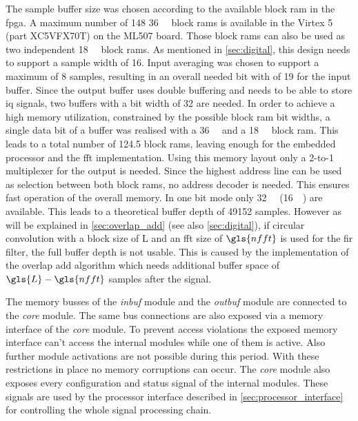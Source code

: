\documentclass[12pt,a4paper,parskip=full,abstract=true,BCOR=12mm,twoside,open=right]{scrreprt}
\def\device#1{\textit{#1}}
\begin{document}
The sample buffer size was chosen according to the available block
\gls{ram} in the \gls{fpga}. A maximum number of 148 \SI{36}{\kilo\bit} block
\glspl{ram} is available in the Virtex 5 (part XC5VFX70T) on the ML507 board\cite{virtex5ds}. Those block \glspl{ram}
can also be used as two independent \SI{18}{\kilo\bit} block \glspl{ram}. As
mentioned in \cref{sec:digital}, this design needs to support a sample width
of \SI{16}{\bit}. Input averaging was chosen to support a maximum of 8 samples,
resulting in an overall needed bit with of \SI{19}{\bit} for the input buffer. Since
the output buffer uses double buffering and needs to be able to store \gls{iq} signals,
two buffers with a bit width of \SI{32}{\bit} are needed. In order to achieve a high memory utilization,
constrained by the possible block \gls{ram} bit widths, a single data bit of a buffer was
realised with a \SI{36}{\kilo\bit} and a \SI{18}{\kilo\bit} block \gls{ram}. This leads
to a total number of 124.5 block \glspl{ram}, leaving enough for the embedded processor
and the \gls{fft} implementation. Using this memory layout only a 2-to-1 multiplexer
for the output is needed. Since the highest address line can
be used as selection between both block \glspl{ram}, no address decoder is needed. This ensures fast operation of the
overall memory. In one bit mode only \SI{32}{\kilo\bit} (\SI{16}{\kilo\bit})
are available. This leads to a theoretical buffer depth of 49152 samples. However as
will be explained in \cref{sec:overlap_add} (see also \cref{sec:digital}), if circular convolution
with a block size of \gls{L} and an \gls{fft} size of $\gls{nfft}$ is used for the \gls{fir} filter,
the full buffer depth is not usable. This is caused by the implementation of the overlap add
algorithm which needs additional buffer space of $\gls{L} - \gls{nfft}$ samples after the signal.

The memory busses of the \device{inbuf} module and the \device{outbuf} module are
connected to the \device{core} module. The same bus connections are also exposed
via a memory interface of the \device{core} module. To prevent access violations
the exposed memory interface can't access the internal modules while one of
them is active. Also further module activations are not possible
during this period. With these restrictions in place no memory corruptions can
occur. The \device{core} module also exposes every configuration and status signal
of the internal modules. These signals are used by the processor interface described
in \cref{sec:processor_interface} for controlling the whole signal processing chain.
\end{document}

